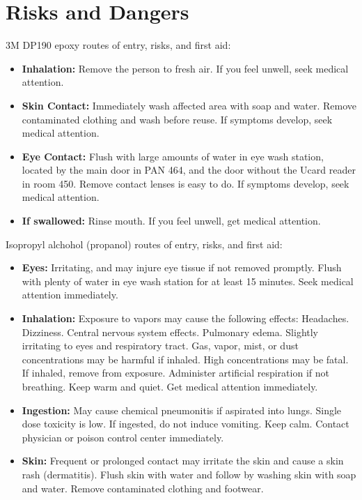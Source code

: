 \documentclass[letterpaper,12pt]{article}
\begin{document}
\section{Risks and Dangers}
3M DP190 epoxy routes of entry, risks, and first aid:
\begin{itemize}
\item {\bf Inhalation:} Remove the person to fresh air. If you feel unwell, seek medical attention.
\item {\bf Skin Contact:} Immediately wash affected area with soap and water. Remove contaminated clothing and wash before reuse. If symptoms develop, seek medical attention.
\item {\bf Eye Contact:} Flush with large amounts of water in eye wash station, located by the main door in PAN 464, and the door without the Ucard reader in room 450. Remove contact lenses is easy to do. If symptoms develop, seek medical attention.
\item {\bf If swallowed:} Rinse mouth. If you feel unwell, get medical attention.
\end{itemize}

\noindent
Isopropyl alchohol (propanol) routes of entry, risks, and first aid:
\begin{itemize}
\item {\bf Eyes:} Irritating, and may injure eye tissue if not removed promptly. Flush with plenty of water in eye wash station for at least 15 minutes. Seek medical attention immediately.

\item {\bf Inhalation:} Exposure to vapors may cause the following effects: Headaches. Dizziness. Central nervous system effects. Pulmonary edema. Slightly irritating to eyes and respiratory tract. Gas, vapor, mist, or dust concentrations may be harmful if inhaled. High concentrations may be fatal. If inhaled, remove from exposure. Administer artificial respiration if not breathing. Keep warm and quiet. Get medical attention immediately.

\item {\bf Ingestion:} May cause chemical pneumonitis if aspirated into lungs. Single dose toxicity is low. If ingested, do not induce vomiting. Keep calm. Contact physician or poison control center immediately.

\item {\bf Skin:} Frequent or prolonged contact may irritate the skin and cause a skin rash (dermatitis). Flush skin with water and follow by washing skin with soap and water. Remove
contaminated clothing and footwear.

\end{itemize}
\end{document}
